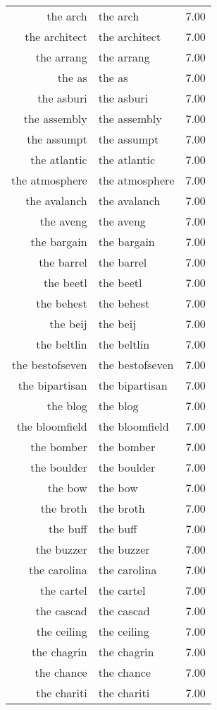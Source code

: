 \begin{table}[ht]
\begin{tabular}{rlr}
  the arch & the arch & 7.00 \\ 
  the architect & the architect & 7.00 \\ 
  the arrang & the arrang & 7.00 \\ 
  the as & the as & 7.00 \\ 
  the asburi & the asburi & 7.00 \\ 
  the assembly & the assembly & 7.00 \\ 
  the assumpt & the assumpt & 7.00 \\ 
  the atlantic & the atlantic & 7.00 \\ 
  the atmosphere & the atmosphere & 7.00 \\ 
  the avalanch & the avalanch & 7.00 \\ 
  the aveng & the aveng & 7.00 \\ 
  the bargain & the bargain & 7.00 \\ 
  the barrel & the barrel & 7.00 \\ 
  the beetl & the beetl & 7.00 \\ 
  the behest & the behest & 7.00 \\ 
  the beij & the beij & 7.00 \\ 
  the beltlin & the beltlin & 7.00 \\ 
  the bestofseven & the bestofseven & 7.00 \\ 
  the bipartisan & the bipartisan & 7.00 \\ 
  the blog & the blog & 7.00 \\ 
  the bloomfield & the bloomfield & 7.00 \\ 
  the bomber & the bomber & 7.00 \\ 
  the boulder & the boulder & 7.00 \\ 
  the bow & the bow & 7.00 \\ 
  the broth & the broth & 7.00 \\ 
  the buff & the buff & 7.00 \\ 
  the buzzer & the buzzer & 7.00 \\ 
  the carolina & the carolina & 7.00 \\ 
  the cartel & the cartel & 7.00 \\ 
  the cascad & the cascad & 7.00 \\ 
  the ceiling & the ceiling & 7.00 \\ 
  the chagrin & the chagrin & 7.00 \\ 
  the chance & the chance & 7.00 \\ 
  the chariti & the chariti & 7.00 \\ 

\end{tabular}
\end{table}
